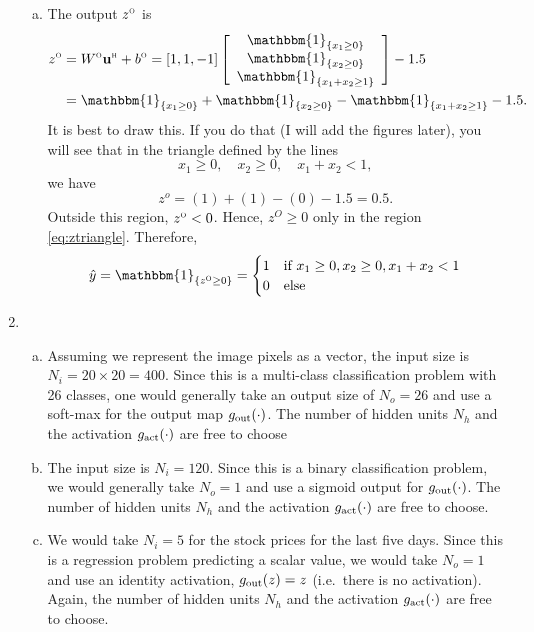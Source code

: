 \documentclass[11pt]{article}
\def\beq{\begin{equation}}
\def\eeq{\end{equation}}
\def\x{\times}
\newcommand{\ubf}{\mathbf{u}}
\newcommand{\indic}[1]{\mathbbm{1}_{ \{ {#1} \} }}
\def\hid{\textsc{\tiny H}}
\def\out{\textsc{\tiny O}}
\begin{document}
\begin{enumerate}
\begin{enumerate}[(a)]
\item The output $z^\out$ is
\begin{align*}
    z^\out &= W^\out \ubf^\hid + b^\out =
    [1, 1, -1]
    \left[ \begin{array}{c} \indic{x_1 \geq 0} \\ \indic{x_2 \geq 0}
    \\  \indic{x_1+x_2 \geq 1} \end{array} \right]
    - 1.5 \\
    &= \indic{x_1 \geq 0} + \indic{x_2 \geq 0} -\indic{x_1 + x_2 \geq 1} - 1.5.
\end{align*}
It is best to draw this.  If you do that (I will add the figures later),
you will see that in the triangle defined by the lines
\beq \label{eq:ztriangle}
    x_1 \geq 0, \quad x_2 \geq 0, \quad  x_1 + x_2 < 1,
\eeq
we have
\[
    z^o = (1) + (1) -(0)-1.5 = 0.5.
\]
Outside this region, $z^\out < 0$.  Hence, $z^O \geq 0$ only in the region
\eqref{eq:ztriangle}.  Therefore,
\[
    \hat{y} = \indic{z^\out \geq 0} =
    \begin{cases}
        1 & \mbox{if } x_1 \geq 0, x_2 \geq 0, x_1 + x_2 < 1 \\
        0 & \mbox{else}
     \end{cases}
\]

\end{enumerate}

\item
\begin{enumerate}[(a)]
\item Assuming we represent the image pixels as a vector,
the input size is $N_i=20\x20=400$.  Since this is a multi-class classification problem
with 26 classes, one would generally take an output size of $N_o=26$ and use a soft-max for
the output map $g_{\rm out}(\cdot)$.    The number of hidden units $N_h$
and the activation $g_{\rm act}(\cdot)$ are free to choose

\item The input size is $N_i=120$. Since this is a binary classification problem,
we would generally take $N_o=1$ and use a sigmoid output for
$g_{\rm out}(\cdot)$.    The number of hidden units $N_h$
and the activation $g_{\rm act}(\cdot)$ are free to choose.

\item We would take $N_i=5$ for the stock prices for the last five days.
Since this is a regression problem predicting a scalar value, we would take
$N_o=1$ and use an identity activation, $g_{\rm out}(z)=z$ (i.e.\ there is
no activation).
Again, the number of hidden units $N_h$
and the activation $g_{\rm act}(\cdot)$ are free to choose.
\end{enumerate}


\end{enumerate}
\end{document}

